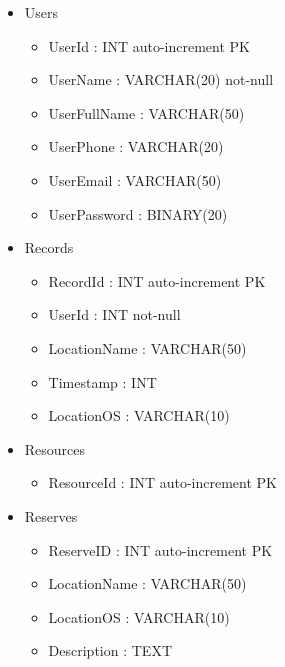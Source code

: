         \begin{itemize}
            \item Users
            \begin{itemize}
                \item UserId : INT auto-increment PK
                \item UserName : VARCHAR(20) not-null
                \item UserFullName : VARCHAR(50)
                \item UserPhone : VARCHAR(20)
                \item UserEmail : VARCHAR(50)
                \item UserPassword : BINARY(20)
            \end{itemize}
                
            \item Records
            \begin{itemize}
                \item RecordId : INT auto-increment PK
                \item UserId : INT not-null
                \item LocationName : VARCHAR(50)
                \item Timestamp : INT
                \item LocationOS : VARCHAR(10)
            \end{itemize}
                
            \item Resources
            \begin{itemize}
                \item ResourceId : INT auto-increment PK
            \end{itemize}
            
            \item Reserves
            \begin{itemize}
                \item ReserveID : INT auto-increment PK
                \item LocationName : VARCHAR(50)
                \item LocationOS : VARCHAR(10)
                \item Description : TEXT
            \end{itemize}


\end{itemize}
